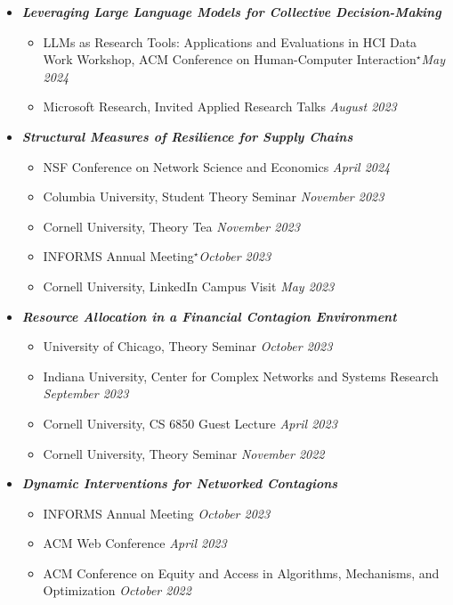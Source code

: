 \documentclass[margin]{res}
\newcommand{\presentedbycoauthor}[0]{\ensuremath {^{\star}}}
\newcommand{\bemph}[1]{\textbf{\emph{#1}}}
\begin{document}
\begin{resume}
\begin{itemize}[nosep]
	\item \bemph{Leveraging Large Language Models for Collective Decision-Making}
	\begin{itemize}[nosep]
		\item LLMs as Research Tools: Applications and Evaluations in HCI Data Work Workshop, ACM Conference on Human-Computer Interaction\presentedbycoauthor \hfill \emph{May 2024}
		\item Microsoft Research, Invited Applied Research Talks \hfill \emph{August 2023}
	\end{itemize}

	\item \bemph{Structural Measures of Resilience for Supply Chains}
	\begin{itemize}[nosep]
		\item NSF Conference on Network Science and Economics \hfill \emph{April 2024}
		\item Columbia University, Student Theory Seminar \hfill \emph{November 2023}
		\item Cornell University, Theory Tea \hfill \emph{November 2023}
		\item INFORMS Annual Meeting\presentedbycoauthor \hfill \emph{October 2023}
		\item Cornell University, LinkedIn Campus Visit \hfill \emph{May 2023}
	\end{itemize}

	\item \bemph{Resource Allocation in a Financial Contagion Environment}
	\begin{itemize}[nosep]
		\item University of Chicago, Theory Seminar \hfill \emph{October 2023}
		\item Indiana University, Center for Complex Networks and Systems Research \\ \hfill \emph{September 2023} 
		\item Cornell University, CS 6850 Guest Lecture \hfill \emph{April 2023}
		\item Cornell University, Theory Seminar \hfill \emph{November 2022}
	\end{itemize}
	
	\item \bemph{Dynamic Interventions for Networked Contagions}
	\begin{itemize}[nosep]
		\item INFORMS Annual Meeting \hfill \emph{October 2023}
		\item ACM Web Conference \hfill \emph{April 2023}	
		\item ACM Conference on Equity and Access in Algorithms, Mechanisms, and Optimization \hfill \emph{October 2022}
	\end{itemize}


\end{itemize}
\end{resume}
\end{document}

